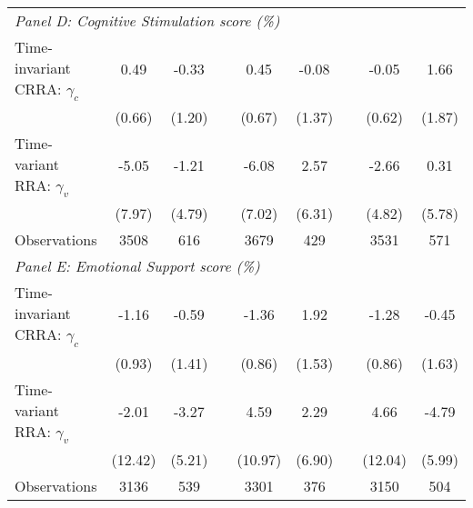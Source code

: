 {\begin{tabular}{l*{8}{c}}
\midrule
\multicolumn{9}{l}{\textit{Panel D: Cognitive Stimulation score (\%)}} \\
Time-invariant CRRA: $\gamma_c$&     0.49     &    -0.33  &  & 0.45 & -0.08 &&   -0.05 &     1.66       \\
                &   (0.66) &   (1.20)&    &  (0.67) & (1.37) && (0.62) &   (1.87)       \\
\addlinespace
Time-variant RRA: $\gamma_v$&    -5.05  &    -1.21    &    & -6.08 & 2.57 &&   -2.66 &     0.31         \\
         &   (7.97)&   (4.79)    &   & (7.02) & (6.31) &&  (4.82)  &   (5.78)         \\
\midrule
Observations    &     3508   &      616         &  & 3679 & 429 &&    3531    &      571  \\



\midrule
\multicolumn{9}{l}{\textit{Panel E: Emotional Support score (\%)}}  \\
Time-invariant CRRA: $\gamma_c$&    -1.16    &    -0.59  &    & -1.36 & 1.92 &&   -1.28    &    -0.45\\
                &   (0.93)    &   (1.41)     &    & (0.86) & (1.53) &&  (0.86)  &   (1.63) \\
\addlinespace
Time-variant RRA: $\gamma_v$&   -2.01     &    -3.27     &   & 4.59 & 2.29 &&    4.66     &    -4.79         \\
    &  (12.42)     &     (5.21)     &    & (10.97) & (6.90) &&  (12.04)  &   (5.99)      \\
\midrule
Observations    &     3136    &      539   &    & 3301 & 376 &&     3150   &      504 \\
\bottomrule

\end{tabular}
}
